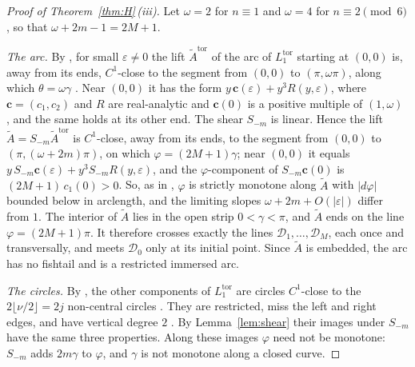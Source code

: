 \begin{proof}[Proof of Theorem~\ref{thm:H}\,(iii)]
Let $\omega=2$ for $n\equiv1$ and $\omega=4$ for $n\equiv2\pmod6$, so that $\omega+2m-1=2M+1$.

\emph{The arc.} By \cite[Prop.~5.7(3) and Lemma~6.1]{WuebbenV}, for small $\varepsilon\neq0$ the lift $\tilde A^{\mathrm{tor}}$
of the arc of $L_1^{\mathrm{tor}}$ starting at $(0,0)$ is, away from its ends, $C^1$-close to the segment from $(0,0)$ to
$(\pi,\omega\pi)$, along which $\theta=\omega\gamma$ \cite[Prop.~3.9]{WuebbenV}. Near $(0,0)$ it has the form
$y\,\mathbf c(\varepsilon)+y^3R(y,\varepsilon)$, where $\mathbf c=(c_1,c_2)$ and $R$ are real-analytic and $\mathbf c(0)$ is a positive multiple of $(1,\omega)$
\cite[Lemma~5.1]{WuebbenV}, and the same holds at its other end. The shear $S_{-m}$ is linear. Hence the lift
$\tilde A=S_{-m}\tilde A^{\mathrm{tor}}$ is $C^1$-close, away from its ends, to the segment from $(0,0)$ to
$(\pi,(\omega+2m)\pi)$, on which $\varphi=(2M+1)\gamma$; near $(0,0)$ it equals
$y\,S_{-m}\mathbf c(\varepsilon)+y^3S_{-m}R(y,\varepsilon)$, and the $\varphi$-component of $S_{-m}\mathbf c(0)$ is $(2M+1)\,c_1(0)>0$. So, as
in \cite[Cor.~5.3]{WuebbenV}, $\varphi$ is strictly monotone along $\tilde A$ with $|d\varphi|$ bounded below in
arclength, and the limiting slopes $\omega+2m+O(|\varepsilon|)$ differ from $1$. The interior of $\tilde A$ lies in the open
strip $0<\gamma<\pi$, and $\tilde A$ ends on the line $\varphi=(2M+1)\pi$. It therefore crosses exactly the lines
$\mathcal D_1,\dots,\mathcal D_M$, each once and transversally, and meets $\mathcal D_0$ only at its initial point. Since $\tilde A$ is
embedded, the arc has no fishtail and is a restricted immersed arc.

\emph{The circles.} By \cite[Prop.~5.7(3)]{WuebbenV}, the other components of $L_1^{\mathrm{tor}}$ are circles
$C^1$-close to the $2\lfloor\nu/2\rfloor=2j$ non-central circles \cite[Prop.~3.6]{WuebbenV}. They are restricted,
miss the left and right edges, and have vertical degree $2$ \cite[Cor.~4.8 and Lemma~6.6]{WuebbenV}. By
Lemma~\ref{lem:shear} their images under $S_{-m}$ have the same three properties. Along these images
$\varphi$ need not be monotone: $S_{-m}$ adds $2m\gamma$ to $\varphi$, and $\gamma$ is not monotone along a closed curve.


\end{proof}

